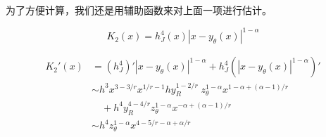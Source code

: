 \documentclass{ctexart}
\begin{document}
为了方便计算，我们还是用辅助函数来对上面一项进行估计。

\begin{equation}
    K_2(x) = h_J^4(x)|x-y_\theta(x)|^{1-\alpha}
\end{equation}

\begin{equation}
    \begin{aligned}
        K_2'(x) & = (h_J^4)'|x-y_\theta(x)|^{1-\alpha} + h_J^4 (|x-y_\theta(x)|^{1-\alpha})'                  \\
                & \sim h^3 x^{3-3/r} x^{1/r-1} h y_R^{1-2/r} \; z_\theta^{1-\alpha} x^{1-\alpha+(\alpha-1)/r} \\
                & \quad + h^4 y_R^{4-4/r} z_\theta^{1-\alpha} x^{-\alpha + (\alpha-1)/r}                      \\
                & \sim h^4 z_\theta^{1-\alpha} x^{4-5/r-\alpha+\alpha/r}
    \end{aligned}
\end{equation}
\end{document}
